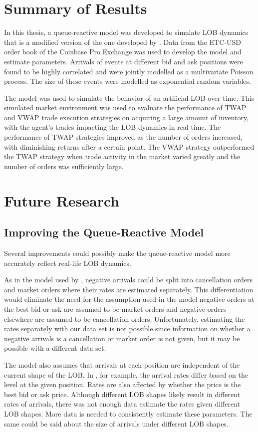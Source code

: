 \section{Summary of Results}
In this thesis, a queue-reactive model was developed to simulate LOB dynamics that is a modified version of the one developed by \cite{A6}. Data from the ETC-USD order book of the Coinbase Pro Exchange was used to develop the model and estimate parameters. Arrivals of events at different bid and ask positions were found to be highly correlated and were jointly modelled as a multivariate Poisson process. The size of these events were modelled as exponential random variables. 

The model was used to simulate the behavior of an artificial LOB over time. This simulated market environment was used to evaluate the performance of TWAP and VWAP trade execution strategies on acquiring a large amount of inventory, with the agent's trades impacting the LOB dynamics in real time. The performance of TWAP strategies improved as the number of orders increased, with diminishing returns after a certain point. The VWAP strategy outperformed the TWAP strategy when trade activity in the market varied greatly and the number of orders was sufficiently large.

\section{Future Research}
\subsection{Improving the Queue-Reactive Model}
Several improvements could possibly make the queue-reactive model more accurately reflect real-life LOB dynamics. 

As in the model used by \cite{A6}, negative arrivals could be split into cancellation orders and market orders where their rates are estimated separately. This differentiation would eliminate the need for the assumption used in the model negative orders at the best bid or ask are assumed to be market orders and negative orders elsewhere are assumed to be cancellation orders. Unfortunately, estimating the rates separately with our data set is not possible since information on whether a negative arrivals is a cancellation or market order is not given, but it may be possible with a different data set.

The model also assumes that arrivals at each position are independent of the current shape of the LOB. In \cite{A6}, for example, the arrival rates differ based on the level at the given position. Rates are also affected by whether the price is the best bid or ask price. Although different LOB shapes likely result in different rates of arrivals, there was not enough data estimate the rates given different LOB shapes. More data is needed to consistently estimate these parameters. The same could be said about the size of arrivals under different LOB shapes.

